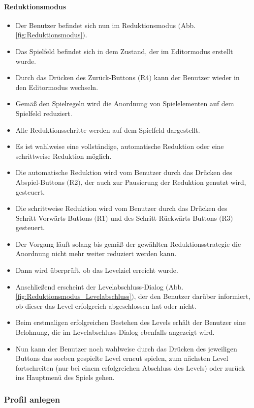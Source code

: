 \paragraph{Reduktionsmodus}
\begin{itemize}
	\item Der Benutzer befindet sich nun im Reduktionsmodus $($Abb. \ref{fig:Reduktionsmodus}$)$.
	\item Das Spielfeld befindet sich in dem Zustand, der im Editormodus erstellt wurde.
	\item Durch das Drücken des Zurück-Buttons $($R4$)$ kann der Benutzer wieder in den Editormodus wechseln.
	\item Gemäß den Spielregeln wird die Anordnung von Spielelementen auf dem Spielfeld reduziert.
	\item Alle Reduktionsschritte werden auf dem Spielfeld dargestellt.
	\item Es ist wahlweise eine vollständige, automatische Reduktion oder eine schrittweise Reduktion möglich.
	\item Die automatische Reduktion wird vom Benutzer durch das Drücken des Abspiel-Buttons $($R2$)$, der auch zur Pausierung der Reduktion genutzt wird, gesteuert.
	\item Die schrittweise Reduktion wird vom Benutzer durch das Drücken des Schritt-Vorwärts-Buttons $($R1$)$ und des Schritt-Rückwärts-Buttons $($R3$)$ gesteuert.
	\item Der Vorgang läuft solang bis gemäß der gewählten Reduktionsstrategie die Anordnung nicht mehr weiter reduziert werden kann.
	\item Dann wird überprüft, ob das Levelziel erreicht wurde.
	\item Anschließend erscheint der Levelabschluss-Dialog $($Abb. \ref{fig:Reduktionsmodus_Levelabschluss}$)$, der den Benutzer darüber informiert, ob dieser das Level erfolgreich abgeschlossen hat oder nicht.
	\item Beim erstmaligen erfolgreichen Bestehen des Levels erhält der Benutzer eine Belohnung, die im Levelabschluss-Dialog ebenfalls angezeigt wird.
	\item Nun kann der Benutzer noch wahlweise durch das Drücken des jeweiligen Buttons das soeben gespielte Level erneut spielen, zum nächsten Level fortschreiten (nur bei einem erfolgreichen Abschluss des Levels) oder zurück ins Hauptmenü des Spiels gehen.
\end{itemize}

\subsubsection{Profil anlegen}
